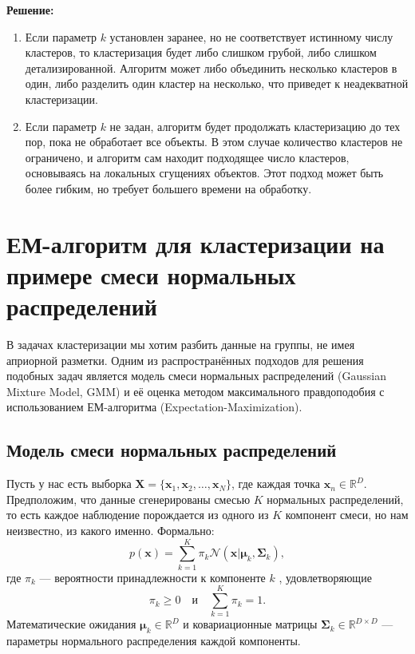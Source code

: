 \textbf{Решение:}
\begin{enumerate}
    \item Если параметр \( k \) установлен заранее, но не соответствует истинному числу кластеров, то кластеризация будет либо слишком грубой, либо слишком детализированной. Алгоритм может либо объединить несколько кластеров в один, либо разделить один кластер на несколько, что приведет к неадекватной кластеризации.
    \item Если параметр \( k \) не задан, алгоритм будет продолжать кластеризацию до тех пор, пока не обработает все объекты. В этом случае количество кластеров не ограничено, и алгоритм сам находит подходящее число кластеров, основываясь на локальных сгущениях объектов. Этот подход может быть более гибким, но требует большего времени на обработку.
\end{enumerate}


\section{ЕМ-алгоритм для кластеризации на примере смеси нормальных распределений}

В задачах кластеризации мы хотим разбить данные на группы, не имея априорной разметки. Одним из распространённых подходов для решения подобных задач является модель смеси нормальных распределений (Gaussian Mixture Model, GMM) и её оценка методом максимального правдоподобия с использованием ЕМ-алгоритма (Expectation-Maximization).

\subsection{Модель смеси нормальных распределений}

Пусть у нас есть выборка $\mathbf{X} = \{\mathbf{x}_1, \mathbf{x}_2, \ldots, \mathbf{x}_N\}$, где каждая точка $\mathbf{x}_n \in \mathbb{R}^D$. Предположим, что данные сгенерированы смесью $K$ нормальных распределений, то есть каждое наблюдение порождается из одного из $K$ компонент смеси, но нам неизвестно, из какого именно. Формально:
\begin{equation*}
p(\mathbf{x}) = \sum_{k=1}^{K} \pi_k \mathcal{N}(\mathbf{x}|\boldsymbol{\mu}_k, \boldsymbol{\Sigma}_k),
\end{equation*} 
где $\pi_k$ --- вероятности принадлежности к компоненте $k$ , удовлетворяющие 
\begin{equation*}
\pi_k \geq 0 \quad \text{и} \quad \sum_{k=1}^K \pi_k = 1.
\end{equation*} 
Математические ожидания $\boldsymbol{\mu}_k \in \mathbb{R}^D$ и ковариационные матрицы $\boldsymbol{\Sigma}_k \in \mathbb{R}^{D \times D}$ --- параметры нормального распределения каждой компоненты.

